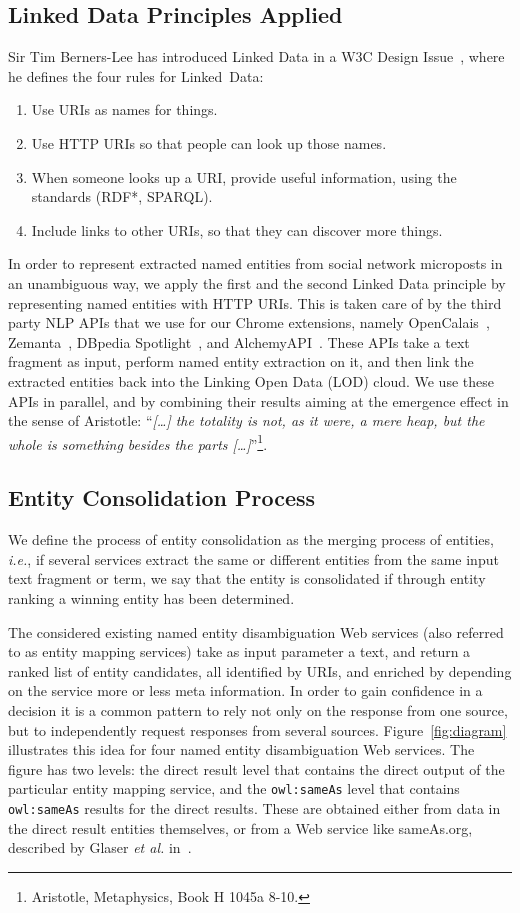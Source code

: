 \documentclass[twocolumn]{article}
\begin{document}
\subsection{Linked Data Principles Applied}
Sir Tim Berners-Lee has introduced Linked Data in a W3C Design Issue~\cite{TimBL:LinkedData}, where he defines the four rules for Linked~Data:
\begin{enumerate}
\item Use URIs as names for things.
\item Use HTTP URIs so that people can look up those names.
\item When someone looks up a URI, provide useful information, using the standards (RDF*, SPARQL).
\item Include links to other URIs, so that they can discover more things.
\end{enumerate}
In order to represent extracted named entities from social network microposts in an unambiguous way, we apply the first and the second Linked Data principle by representing named entities with HTTP URIs. This is taken care of by the third party NLP APIs that we use for our Chrome extensions, namely OpenCalais~\cite{OpenCalais}, Zemanta~\cite{Zemanta}, DBpedia Spotlight~\cite{spotlight}, and AlchemyAPI~\cite{AlchemyAPI}. These APIs take a text fragment as input, perform named entity extraction on it, and then link the extracted entities back into the Linking Open Data (LOD) cloud. We use these APIs in parallel, and by combining their results aiming at the emergence effect in the sense of Aristotle: ``\emph{[\ldots] the totality is not, as it were, a mere heap, but the whole is something besides the parts [\ldots]}''\footnote{Aristotle, Metaphysics, Book H 1045a 8-10.}. 

\subsection{Entity Consolidation Process}
We define the process of entity consolidation as the merging process of entities, \emph{i.e.}, if several services extract the same or different
entities from the same input text fragment or term, we say that the entity is consolidated if through entity ranking a winning entity has been determined.

The considered existing named entity disambiguation Web services (also referred to as entity mapping services) take as input parameter a text, and return a ranked list of entity
candidates, all identified by URIs, and enriched by depending on the service more or less meta information. In order to
gain confidence in a decision it is a common pattern to rely not only on the response from one source, but to
independently request responses from several sources. Figure~\ref{fig:diagram} illustrates this idea for four named entity disambiguation Web services. The figure has two levels: the direct result level that contains the direct output of the 
particular entity mapping service, and the \texttt{owl:sameAs} level that contains \texttt{owl:sameAs} results for the
direct results. These are obtained either from data in the direct result entities themselves, or from a Web service
like sameAs.org, described by Glaser \emph{et al.} in~\cite{Glaser:SameAs}.
\end{document}
